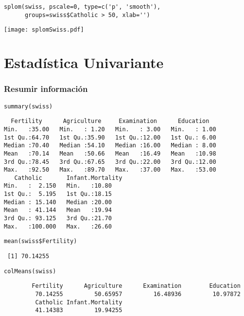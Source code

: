 \documentclass{beamer}
\begin{document}
\begin{frame}[fragile]


\lstset{language=R}
\begin{lstlisting}
splom(swiss, pscale=0, type=c('p', 'smooth'),
      groups=swiss$Catholic > 50, xlab='')
\end{lstlisting}

\texttt{[image: splomSwiss.pdf]}
\end{frame}
\section{Estadística Univariante}
\label{sec-2}
\begin{frame}[fragile]
\frametitle{Resumir información}
\label{sec-2-1}


\lstset{language=R}
\begin{lstlisting}
summary(swiss)
\end{lstlisting}


\begin{verbatim}
  Fertility      Agriculture     Examination      Education    
Min.   :35.00   Min.   : 1.20   Min.   : 3.00   Min.   : 1.00  
1st Qu.:64.70   1st Qu.:35.90   1st Qu.:12.00   1st Qu.: 6.00  
Median :70.40   Median :54.10   Median :16.00   Median : 8.00  
Mean   :70.14   Mean   :50.66   Mean   :16.49   Mean   :10.98  
3rd Qu.:78.45   3rd Qu.:67.65   3rd Qu.:22.00   3rd Qu.:12.00  
Max.   :92.50   Max.   :89.70   Max.   :37.00   Max.   :53.00  
   Catholic       Infant.Mortality
Min.   :  2.150   Min.   :10.80   
1st Qu.:  5.195   1st Qu.:18.15   
Median : 15.140   Median :20.00   
Mean   : 41.144   Mean   :19.94   
3rd Qu.: 93.125   3rd Qu.:21.70   
Max.   :100.000   Max.   :26.60
\end{verbatim}


\lstset{language=R}
\begin{lstlisting}
mean(swiss$Fertility)
\end{lstlisting}

\begin{verbatim}
 [1] 70.14255
\end{verbatim}


\lstset{language=R}
\begin{lstlisting}
colMeans(swiss)
\end{lstlisting}

\begin{verbatim}
        Fertility      Agriculture      Examination        Education 
         70.14255         50.65957         16.48936         10.97872 
         Catholic Infant.Mortality 
         41.14383         19.94255
\end{verbatim}
\end{frame}
\end{document}
